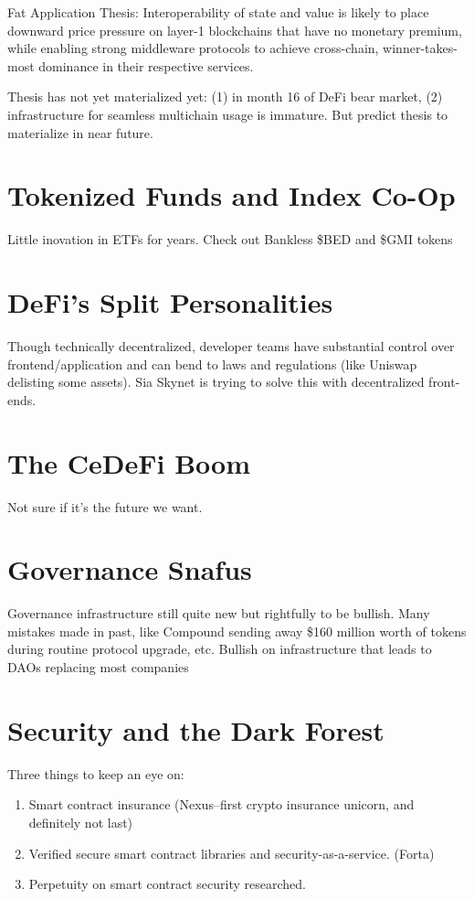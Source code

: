 \documentclass{../notes}
\begin{document}
Fat Application Thesis: Interoperability of state and value is likely to place downward price pressure on layer-1 blockchains that have no monetary premium, while enabling strong middleware protocols to achieve cross-chain, winner-takes-most dominance in their respective services.

Thesis has not yet materialized yet: (1) in month 16 of DeFi bear market, (2) infrastructure for seamless multichain usage is immature. But predict thesis to materialize in near future. 

\section{Tokenized Funds and Index Co-Op}
Little inovation in ETFs for years. Check out Bankless \$BED and \$GMI tokens

\section{DeFi's Split Personalities}
Though technically decentralized, developer teams have substantial control over frontend/application and can bend to laws and regulations (like Uniswap delisting some assets). Sia Skynet is trying to solve this with decentralized front-ends.

\section{The CeDeFi Boom}
Not sure if it's the future we want. 

\section{Governance Snafus}
Governance infrastructure still quite new but rightfully to be bullish. Many mistakes made in past, like Compound sending away \$160 million worth of tokens during routine protocol upgrade, etc. Bullish on infrastructure that leads to DAOs replacing most companies

\section{Security and the Dark Forest}
Three things to keep an eye on:
\begin{enumerate}
    \item Smart contract insurance (Nexus--first crypto insurance unicorn, and definitely not last)
    \item Verified secure smart contract libraries and security-as-a-service. (Forta)
    \item Perpetuity on smart contract security researched. 
\end{enumerate}
\end{document}
